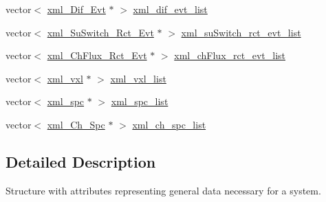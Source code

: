 \begin{DoxyCompactItemize}
\item 
vector$<$ \hyperlink{structnw_1_1_standard___ipt_1_1xml___dif___evt}{xml\+\_\+\+Dif\+\_\+\+Evt} $\ast$ $>$ \hyperlink{structnw_1_1_standard___ipt_1_1xml__gen__data_a115f67778a3d29d716303c194354d2f7}{xml\+\_\+dif\+\_\+evt\+\_\+list}
\item 
vector$<$ \hyperlink{structnw_1_1_standard___ipt_1_1xml___su_switch___rct___evt}{xml\+\_\+\+Su\+Switch\+\_\+\+Rct\+\_\+\+Evt} $\ast$ $>$ \hyperlink{structnw_1_1_standard___ipt_1_1xml__gen__data_a4da34a5918c4e045ed5021da6fdbc6bf}{xml\+\_\+su\+Switch\+\_\+rct\+\_\+evt\+\_\+list}
\item 
vector$<$ \hyperlink{structnw_1_1_standard___ipt_1_1xml___ch_flux___rct___evt}{xml\+\_\+\+Ch\+Flux\+\_\+\+Rct\+\_\+\+Evt} $\ast$ $>$ \hyperlink{structnw_1_1_standard___ipt_1_1xml__gen__data_ae0479559e90fe38932ac604852a1541f}{xml\+\_\+ch\+Flux\+\_\+rct\+\_\+evt\+\_\+list}
\item 
vector$<$ \hyperlink{structnw_1_1_standard___ipt_1_1xml__vxl}{xml\+\_\+vxl} $\ast$ $>$ \hyperlink{structnw_1_1_standard___ipt_1_1xml__gen__data_af091596661fc87ef8c7f28317555c6af}{xml\+\_\+vxl\+\_\+list}
\item 
vector$<$ \hyperlink{structnw_1_1_standard___ipt_1_1xml__spc}{xml\+\_\+spc} $\ast$ $>$ \hyperlink{structnw_1_1_standard___ipt_1_1xml__gen__data_a70786e61ea513972d7c50982e101726c}{xml\+\_\+spc\+\_\+list}
\item 
vector$<$ \hyperlink{structnw_1_1_standard___ipt_1_1xml___ch___spc}{xml\+\_\+\+Ch\+\_\+\+Spc} $\ast$ $>$ \hyperlink{structnw_1_1_standard___ipt_1_1xml__gen__data_ab46c43b495fd3d278ffeabe88261d36e}{xml\+\_\+ch\+\_\+spc\+\_\+list}
\end{DoxyCompactItemize}


\subsection{Detailed Description}
Structure with attributes representing general data necessary for a system. 

